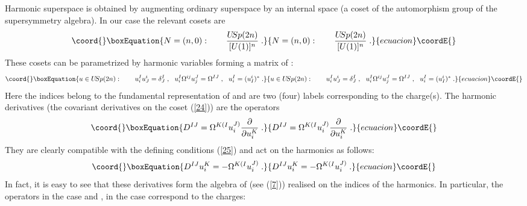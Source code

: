 \documentclass[a4paper,12pt]{article}
\begin{document}
Harmonic superspace is obtained by augmenting ordinary superspace 
\coordHE{} by an internal space (a coset of the 
automorphism group of the supersymmetry algebra). In our case the 
relevant cosets are
\begin{equation}\coord{}\boxEquation{\label{24}
  N=(n,0):\qquad {U\hskip-2pt Sp(2n)\over [U(1)]^n}\;.
}{N=(n,0):\qquad {U\hskip-2pt Sp(2n)\over [U(1)]^n}\;.
}{ecuacion}\coordE{}\end{equation}
These cosets can be parametrized by harmonic variables forming a 
matrix of \coordHE{}: 
\begin{equation}\coord{}\boxEquation{\label{25}
  u\in U\hskip-2pt Sp(2n): \qquad u^I_iu^i_J = \delta^I_J\;, 
\ \ u^I_i \Omega^{ij}u^J_j = \Omega^{IJ}\;, \ \  u^I_i= 
(u^i_I)^*\;. 
}{u\in U\hskip-2pt Sp(2n): \qquad u^I_iu^i_J = \delta^I_J\;, 
\ \ u^I_i \Omega^{ij}u^J_j = \Omega^{IJ}\;, \ \  u^I_i= 
(u^i_I)^*\;. 
}{ecuacion}\coordE{}\end{equation}
Here the indices \coordHE{} belong to the fundamental representation of  
\coordHE{} and \coordHE{} are two (four) labels corresponding 
to the \coordHE{} charge(s). The harmonic derivatives (the covariant 
derivatives on the coset (\ref{24})) are the operators 
\begin{equation}\coord{}\boxEquation{\label{26}
  D^{IJ} = \Omega^{K(I}u^{J)}_i{\partial\over\partial u^K_i}\;.
}{D^{IJ} = \Omega^{K(I}u^{J)}_i{\partial\over\partial u^K_i}\;.
}{ecuacion}\coordE{}\end{equation}
They are clearly compatible with the defining conditions 
(\ref{25}) and act on the harmonics as follows:
\begin{equation}\coord{}\boxEquation{\label{27}
   D^{IJ}u^K_i = -\Omega^{K(I}u^{J)}_i\;.
}{D^{IJ}u^K_i = -\Omega^{K(I}u^{J)}_i\;.
}{ecuacion}\coordE{}\end{equation}
In fact, it is easy to see that these derivatives form the algebra 
of \coordHE{} (see (\ref{7})) realised on the indices 
\coordHE{} of the harmonics. In particular, the operators \coordHE{} 
in the case \coordHE{} and \coordHE{}, \coordHE{} 
in the case \coordHE{} correspond to the \coordHE{} charges: 
\end{document}
